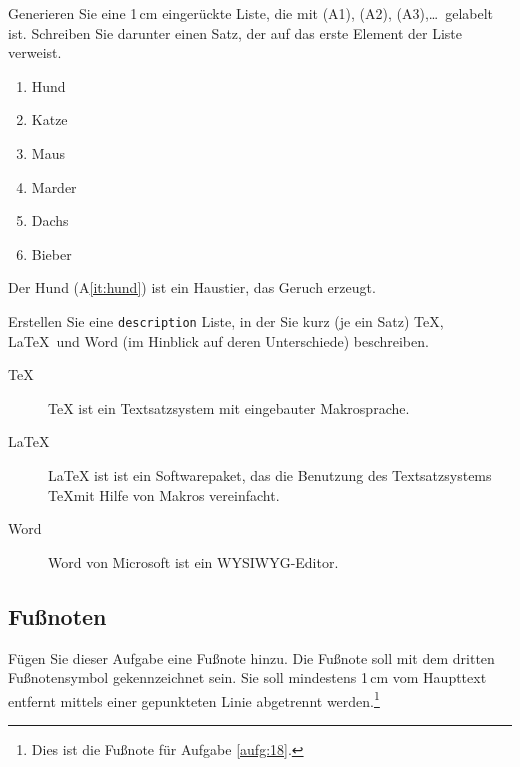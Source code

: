 \begin{aufgabe}
Generieren Sie eine 1\,cm einger\"uckte Liste, die mit (A1), (A2), (A3),\dots\ gelabelt ist. Schreiben Sie darunter einen Satz, der auf das erste Element der Liste verweist.
\end{aufgabe}

\begin{enumerate}[\hspace{1cm} ({A}1)]
 \item Hund \label{it:hund}
 \item Katze \label{it:katze}
 \item Maus
 \item Marder
 \item Dachs
 \item Bieber
\end{enumerate}

\noindent Der Hund (A\ref{it:hund}) ist ein Haustier, das Geruch erzeugt.

\pagebreak
\begin{aufgabe}\label{aufg:desc}
Erstellen Sie eine \textnormal{\texttt{description}} Liste, in der Sie kurz
(je ein Satz) \TeX, \LaTeX\ und Word (im Hinblick auf deren Unterschiede)
beschreiben.
\end{aufgabe}

\begin{description}
 \item[\TeX] TeX ist ein Textsatzsystem mit eingebauter Makrosprache.
 \item[\LaTeX] LaTeX ist ist ein Softwarepaket, das die Benutzung des Textsatzsystems \TeX mit Hilfe von Makros vereinfacht.
 \item[Word] Word von Microsoft ist ein WYSIWYG-Editor.
\end{description}

\subsection{Fußnoten}						%
\begin{aufgabe}
\label{aufg:18}
\setcounter{footnote}{2}
\renewcommand{\thefootnote}{\fnsymbol{footnote}}
F\"ugen Sie dieser Aufgabe eine Fu\ss note hinzu. Die Fu\ss{}note soll mit dem dritten Fu\ss{}notensymbol
gekennzeichnet sein. Sie soll mindestens 1\,cm  vom Haupttext entfernt mittels einer gepunkteten Linie 
abgetrennt werden.\footnote{Dies ist die Fußnote für Aufgabe \ref{aufg:18}.}
\end{aufgabe}

